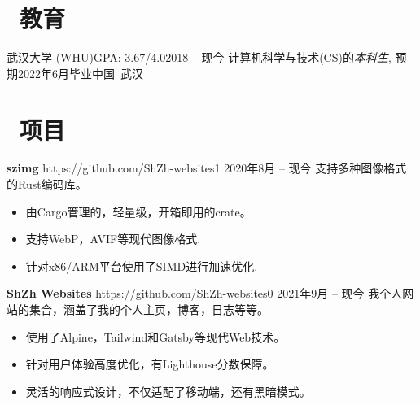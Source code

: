 \documentclass{common}
\begin{document}

\section{\faGraduationCap\ 教育}
\educationsubsection
    {武汉大学 (WHU)}{GPA: 3.67/4.0}{2018 -- 现今}
    {计算机科学与技术(CS)的\textit{本科生}, 预期2022年6月毕业}{中国\ 武汉}

\section{\faCubes\ 项目}
\projectsubsection
    {\textbf{szimg}}
    {https://github.com/ShZh-websites}{1}
    {2020年8月 -- 现今}
支持多种图像格式的Rust编码库。
\begin{itemize}
    \item 由Cargo管理的，轻量级，开箱即用的crate。
    \item 支持WebP，AVIF等现代图像格式.
    \item 针对x86/ARM平台使用了SIMD进行加速优化.
\end{itemize}
\projectsubsection
    {\textbf{ShZh Websites}}
    {https://github.com/ShZh-websites}{0}
    {2021年9月 -- 现今}
我个人网站的集合，涵盖了我的个人主页，博客，日志等等。
\begin{itemize}
    \item 使用了Alpine，Tailwind和Gatsby等现代Web技术。
    \item 针对用户体验高度优化，有Lighthouse分数保障。
    \item 灵活的响应式设计，不仅适配了移动端，还有黑暗模式。
\end{itemize}
\end{document}
